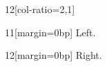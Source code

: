\documentclass[paper=A4]{ropas-poster}
\begin{document}
\begin{postergrid}{1}{2}[col-ratio={2,1}]
\begin{posterblock}{1}{1}[margin=0bp]
Left.
\end{posterblock}
\begin{posterblock}{1}{2}[margin=0bp]
Right.
\end{posterblock}
\end{postergrid}
\end{document}

